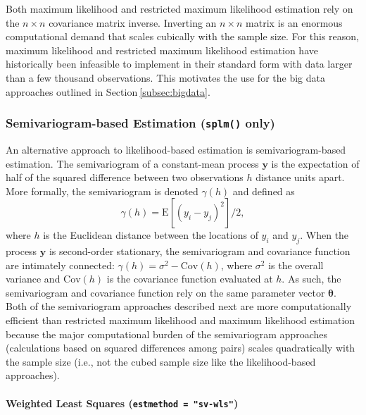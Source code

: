 \documentclass{article}
\begin{document}
Both maximum likelihood and restricted maximum likelihood estimation
rely on the \(n \times n\) covariance matrix inverse. Inverting an
\(n \times n\) matrix is an enormous computational demand that scales
cubically with the sample size. For this reason, maximum likelihood and
restricted maximum likelihood estimation have historically been
infeasible to implement in their standard form with data larger than a
few thousand observations. This motivates the use for the big data
approaches outlined in Section\(~\)\ref{subsec:bigdata}.

\hypertarget{semivariogram-based-estimation-splm-only}{%
\subsubsection{\texorpdfstring{Semivariogram-based Estimation
(\texttt{splm()}
only)}{Semivariogram-based Estimation (splm() only)}}\label{semivariogram-based-estimation-splm-only}}

An alternative approach to likelihood-based estimation is
semivariogram-based estimation. The semivariogram of a constant-mean
process \(\mathbf{y}\) is the expectation of half of the squared
difference between two observations \(h\) distance units apart. More
formally, the semivariogram is denoted \(\gamma(h)\) and defined as
\begin{equation*}\label{eq:sv}
  \gamma(h) = \text{E}[(y_i - y_j)^2] / 2 ,
\end{equation*} where \(h\) is the Euclidean distance between the
locations of \(y_i\) and \(y_j\). When the process \(\mathbf{y}\) is
second-order stationary, the semivariogram and covariance function are
intimately connected: \(\gamma(h) = \sigma^2 - \text{Cov}(h)\), where
\(\sigma^2\) is the overall variance and \(\text{Cov}(h)\) is the
covariance function evaluated at \(h\). As such, the semivariogram and
covariance function rely on the same parameter vector
\(\boldsymbol{\theta}\). Both of the semivariogram approaches described
next are more computationally efficient than restricted maximum
likelihood and maximum likelihood estimation because the major
computational burden of the semivariogram approaches (calculations based
on squared differences among pairs) scales quadratically with the sample
size (i.e., not the cubed sample size like the likelihood-based
approaches).

\hypertarget{weighted-least-squares-estmethod-sv-wls}{%
\paragraph{\texorpdfstring{Weighted Least Squares
(\texttt{estmethod\ =\ "sv-wls"})}{Weighted Least Squares (estmethod = "sv-wls")}}\label{weighted-least-squares-estmethod-sv-wls}}
\end{document}
